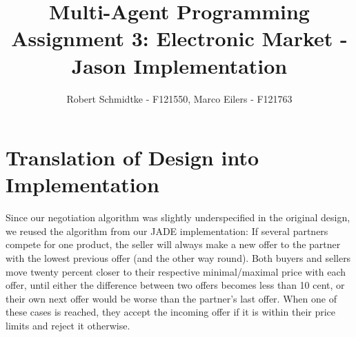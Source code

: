 \documentclass[a4paper,11pt]{article}
\begin{document}
\title{Multi-Agent Programming\\Assignment 3: Electronic Market - Jason Implementation}
\author{Robert Schmidtke - F121550, Marco Eilers - F121763}

\maketitle
\newpage

\section{Translation of Design into Implementation}
Since our negotiation algorithm was slightly underspecified in the original design, we reused the algorithm from our JADE implementation: If several partners compete for one product, the seller will always make a new offer to the partner with the lowest previous offer (and the other way round). Both buyers and sellers move twenty percent closer to their respective minimal/maximal price with each offer, until either the difference between two offers becomes less than 10 cent, or their own next offer would be worse than the partner's last offer. When one of these cases is reached, they accept the incoming offer if it is within their price limits and reject it otherwise.
\end{document}
